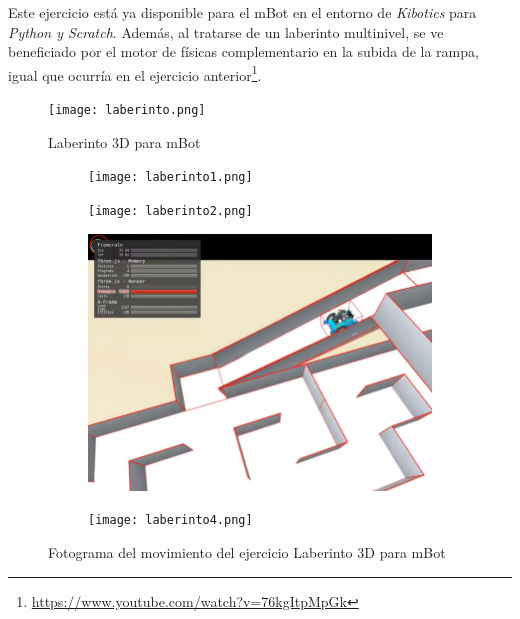 Este ejercicio está ya disponible para el mBot en el entorno de \textit{Kibotics} para \textit{Python y Scratch}. Además, al tratarse de un laberinto multinivel, se ve beneficiado por el motor de físicas complementario en la subida de la rampa, igual que ocurría en el ejercicio anterior\footnote{\url{https://www.youtube.com/watch?v=76kgItpMpGk}}.

\begin{figure}[h!]
    \centering
    \texttt{[image: laberinto.png]}
    \caption{Laberinto 3D para mBot}
    \label{fig:Laberinto 3D para mBot}
\end{figure}

\begin{figure}[h!]
\begin{subfigure}[b]{0.5\textwidth}
    \texttt{[image: laberinto1.png]}
  \end{subfigure}
  \hfill
  \hfill
  \begin{subfigure}[b]{0.5\textwidth}
    \texttt{[image: laberinto2.png]}
  \end{subfigure}
    \hfill
    \hfill
  \begin{subfigure}[b]{0.5\textwidth}
    \includegraphics[width=\textwidth, height=\textwidth]{laberinto3ç.png}
  \end{subfigure}
    \hfill
  \begin{subfigure}[b]{0.5\textwidth}
    \texttt{[image: laberinto4.png]}
  \end{subfigure}
    \caption{Fotograma del movimiento del ejercicio Laberinto 3D para mBot}
    \label{fig:laberinto_movimiento}
\end{figure}


